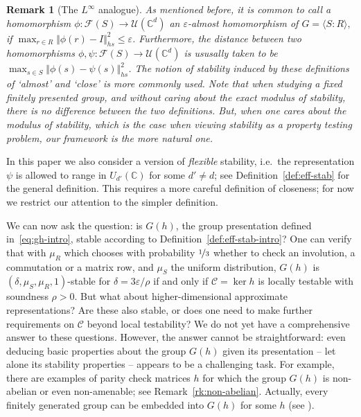 \documentclass[11pt]{article}
\newtheorem{remark}[theorem]{Remark}
\theoremstyle{definition}
\newcommand{\code}{\mathscr{C}}
\newcommand{\Id}{\ensuremath{I}}
\newcommand{\C}{\ensuremath{\mathbb{C}}}
\newcommand{\complex}{\ensuremath{\mathbb{C}}}
\newcommand{\mF}{\ensuremath{\mathcal{F}}}
\newcommand{\mU}{\ensuremath{\mathcal{U}}}
\newcommand{\eps}{\varepsilon}
\begin{document}
\begin{remark}[The $L^\infty$ analogue]\label{rem:L^infty_analogue_defn}
    As mentioned  before, it is common to call a homomorphism $\phi\colon \mF(S)\to \mU(\complex^d)$ an $\eps$-almost homomorphism of $G=\langle S\colon R\rangle,$  if $\max_{r\in R}\Vert \phi(r)-\Id\Vert_{hs}^2\leq \eps$. Furthermore, the distance between two homomorphisms $\phi,\psi\colon \mF(S)\to \mU(\complex^d)$ is ususally taken to be $\max_{s\in S}\Vert \phi(s)-\psi(s)\Vert_{hs}^2$. The notion of stability induced by these definitions of `almost' and `close' is more commonly used. Note that when studying a fixed finitely presented group, and without caring about the exact modulus of stability, there is no difference between the two definitions.  But, when one cares about the modulus of stability, which is the case  when viewing stability as a property testing problem, our framework is the more natural one. 
\end{remark}

In this paper we also consider a version of \emph{flexible} stability, i.e.\ the representation $\psi$ is allowed to range in $U_{d'}(\C)$ for some $d'\neq d$; see Definition~\ref{def:eff-stab} for the general definition. This requires a more careful definition of closeness; for now we restrict our attention to the simpler definition. %

We can now ask the question: is $G(h)$, the group presentation defined in~\eqref{eq:gh-intro}, stable according to Definition~\ref{def:eff-stab-intro}? 
One can verify that with $\mu_R$ which chooses with probability $\nicefrac{1}{3}$ whether to check an involution, a commutation or a matrix row,  and $\mu_S$ the uniform distribution, $G(h)$ is $(\delta,\mu_S,\mu_R,1)$-stable for $\delta=3\eps/\rho$ if and only if $\code = \ker h$ is locally testable with soundness $\rho>0$. But what about higher-dimensional approximate representations? Are these also stable, or does one need to make further requirements on $\code$ beyond local testability? We do not yet have a comprehensive answer to these questions. However, the answer cannot be straightforward: even deducing basic properties about the group $G(h)$ given its presentation -- let alone its stability properties -- appears to be a challenging task. For example, there are examples of parity check matrices $h$ for which the group $G(h)$ is non-abelian or even non-amenable; see Remark~\ref{rk:non-abelian}. Actually, every finitely generated group can be embedded into $G(h)$ for some $h$ (see \cite{slofstra2019set}).
\end{document}
